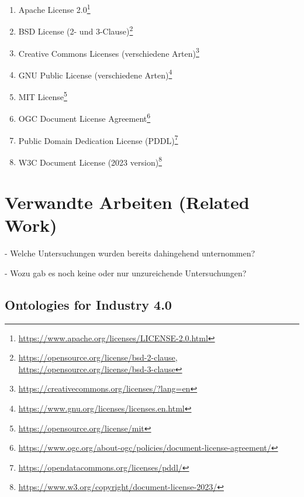 \documentclass{article}
\begin{document}
\begin{enumerate}
    \item Apache License 2.0\footnote{\url{https://www.apache.org/licenses/LICENSE-2.0.html}}
    \item BSD License (2- und 3-Clause)\footnote{\url{https://opensource.org/license/bsd-2-clause}, \url{https://opensource.org/license/bsd-3-clause}}
    \item Creative Commons Licenses (verschiedene Arten)\footnote{\url{https://creativecommons.org/licenses/?lang=en}}
    \item GNU Public License (verschiedene Arten)\footnote{\url{https://www.gnu.org/licenses/licenses.en.html}}
    \item MIT License\footnote{\url{https://opensource.org/license/mit}}
    \item OGC Document License Agreement\footnote{\url{https://www.ogc.org/about-ogc/policies/document-license-agreement/}}
    \item Public Domain Dedication License (PDDL)\footnote{\url{https://opendatacommons.org/licenses/pddl/}}
    \item W3C Document License (2023 version)\footnote{\url{https://www.w3.org/copyright/document-license-2023/}}
\end{enumerate}


\section{Verwandte Arbeiten (Related Work)}

- Welche Untersuchungen wurden bereits dahingehend unternommen?

- Wozu gab es noch keine oder nur unzureichende Untersuchungen?

\subsection{Ontologies for Industry 4.0}
%
\end{document}
